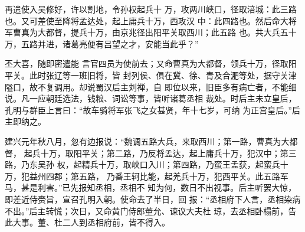 \documentclass[UTF8,12pt,twoside,a4paper]{ctexart} %
\begin{document}
	\begin{center}
	\end{center}
\vspace*{10pt}
\songti {}
\indent\setlength{\parindent}{2em}%
\hspace{1.6em}
再遣使入吴修好，许以割地，令孙权起兵十
万，攻两川峡口，径取涪城：此三路也。又可差使至降将孟达处，起上庸兵十万，西攻汉
中：此四路也。然后命大将军曹真为大都督，提兵十万，由京兆径出阳平关取西川；此五路
也。共大兵五十万，五路并进，诸葛亮便有吕望之才，安能当此乎？”

丕大喜，随即密遣能
言官四员为使前去；又命曹真为大都督，领兵十万，径取阳平关。此时张辽等一班旧将，皆
封列侯、俱在冀、徐、青及合淝等处，据守关津隘口，故不复调用。却说蜀汉后主刘禅，自
即位以来，旧臣多有病亡者，不能细说。凡一应朝廷选法，钱粮、词讼等事，皆听诸葛丞相
裁处。时后主未立皇后，孔明与群臣上言曰：“故车骑将军张飞之女甚贤，年十七岁，可纳
为正宫皇后。”后主即纳之。

建兴元年秋八月，忽有边报说：“魏调五路大兵，来取西川；第一路，曹真为大都督，
起兵十万，取阳平关；第二路，乃反将孟达，起上庸兵十万，犯汉中；第三路，乃东吴孙
权，起精兵十万，取峡口入川；第四路，乃蛮王孟获，起蛮兵十万，犯益州四郡；第五路，
乃番王轲比能，起羌兵十万，犯西平关。此五路军马，甚是利害。”已先报知丞相，丞相不
知为何，数日不出视事。后主听罢大惊，即差近侍赍旨，宣召孔明入朝。使命去了半日，回
报：“丞相府下人言，丞相染病不出。”后主转慌；次日，又命黄门侍郎董允、谏议大夫杜
琼，去丞相卧榻前，告此大事。董、杜二人到丞相府前，皆不得入。
\end{document}
